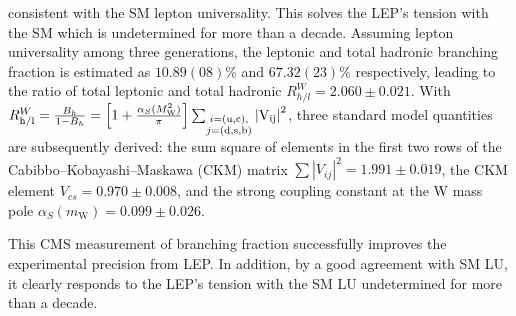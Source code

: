 \noindent consistent with the SM lepton universality. This solves the LEP's tension with the SM which is undetermined for more than a decade. Assuming lepton universality among three generations, the leptonic and total hadronic branching fraction is estimated as $10.89(08)\%$ and $67.32(23)\%$ respectively, leading to the ratio of \PW total leptonic and total hadronic $R^W_{h/l}=2.060 \pm 0.021$. With 
$
    R^W_{\rm h/l} = \frac{B_h}{1-B_h} = 
    \left[1 + \frac{\alpha_{S}(M^{2}_{\mathrm{W}})}{\pi}\right]
    \sum_{\substack{i = (\mathrm{u,c}), \\ j=(\mathrm{d, s, b})}}
    \left|\rm V_{ij}\right|^{2}
$, 
three standard model quantities are subsequently derived: the sum square of elements in the first two rows of the Cabibbo--Kobayashi--Maskawa (CKM) matrix  $\sum{\left|V_{ij}\right|^{2}} = 1.991 \pm 0.019$, the CKM element $V_{cs} = 0.970 \pm 0.008$, and the strong coupling constant at the W mass pole $\alpha_{S}(m_\mathrm{W}) = 0.099 \pm 0.026$.


This CMS measurement of \PW branching fraction successfully improves the experimental precision from LEP. In addition, by a good agreement with SM LU, it clearly responds to the LEP's tension with the SM LU undetermined for more than a decade.